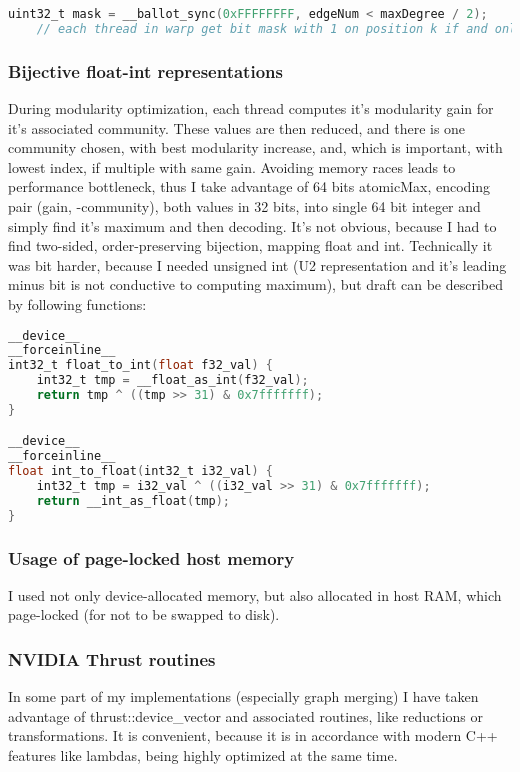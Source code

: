 \documentclass[12pt]{article}
\begin{document}
    \begin{lstlisting}[language=C]
    uint32_t mask = __ballot_sync(0xFFFFFFFF, edgeNum < maxDegree / 2);
    // each thread in warp get bit mask with 1 on position k if and only if thread k holds edgeNum < maxDegree / 2 predicate
    \end{lstlisting}
    
        

\subsubsection*{Bijective float-int representations}
    During modularity optimization, each thread computes it's modularity gain for it's associated community. These values are then reduced, and there is one community chosen, with best modularity increase, and, which is important, with lowest index, if multiple with same gain. Avoiding memory races leads to performance bottleneck, thus I take advantage of 64 bits atomicMax, encoding pair (gain, -community), both values in 32 bits, into single 64 bit integer and simply find it's maximum and then decoding. It's not obvious, because I had to find two-sided, order-preserving bijection, mapping float and int. Technically it was bit harder, because I needed unsigned int (U2 representation and it's leading minus bit is not conductive to computing maximum), but draft can be described by following functions: 
    \begin{lstlisting}[language=C]
__device__
__forceinline__
int32_t float_to_int(float f32_val) {
    int32_t tmp = __float_as_int(f32_val);
    return tmp ^ ((tmp >> 31) & 0x7fffffff);
}

__device__
__forceinline__
float int_to_float(int32_t i32_val) {
    int32_t tmp = i32_val ^ ((i32_val >> 31) & 0x7fffffff);
    return __int_as_float(tmp);
}
    \end{lstlisting}

    
\subsubsection*{Usage of page-locked host memory}
    I used not only device-allocated memory, but also allocated in host RAM, which page-locked (for not to be swapped to disk).

\subsubsection*{NVIDIA Thrust routines}
    In some part of my implementations (especially graph merging) I have taken advantage of thrust::device\_vector and associated routines, like reductions or transformations. It is convenient, because it is in accordance with modern C++ features like lambdas, being highly optimized at the same time.
    
    
\end{document}
